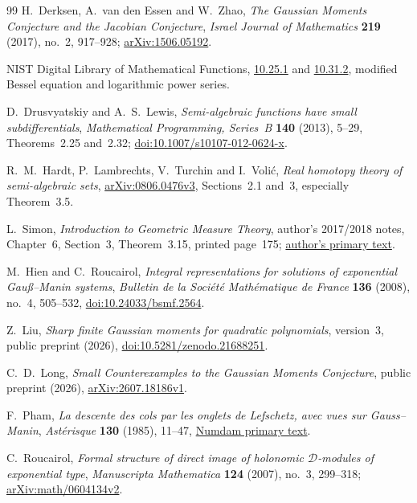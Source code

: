 \documentclass[11pt]{article}
\theoremstyle{definition}\newtheorem{definition}[theorem]{Definition}
\theoremstyle{remark}\newtheorem{remark}[theorem]{Remark}
\begin{document}
\clearpage
\begin{thebibliography}{99}
H.~Derksen, A.~van den Essen and W.~Zhao,
\emph{The Gaussian Moments Conjecture and the Jacobian Conjecture},
\emph{Israel Journal of Mathematics} \textbf{219} (2017), no.~2,
917--928; \href{https://arxiv.org/abs/1506.05192}{arXiv:1506.05192}.

NIST Digital Library of Mathematical Functions,
\href{https://dlmf.nist.gov/10.25.E1}{10.25.1} and
\href{https://dlmf.nist.gov/10.31.E2}{10.31.2},
modified Bessel equation and logarithmic power series.

D.~Drusvyatskiy and A.~S.~Lewis, \emph{Semi-algebraic functions have
small subdifferentials}, \emph{Mathematical Programming, Series~B}
\textbf{140} (2013), 5--29, Theorems~2.25 and~2.32;
\href{https://doi.org/10.1007/s10107-012-0624-x}{doi:10.1007/s10107-012-0624-x}.

R.~M.~Hardt, P.~Lambrechts, V.~Turchin and I.~Voli\'c,
\emph{Real homotopy theory of semi-algebraic sets},
\href{https://arxiv.org/abs/0806.0476v3}{arXiv:0806.0476v3},
Sections~2.1 and~3, especially Theorem~3.5.

L.~Simon, \emph{Introduction to Geometric Measure Theory},
author's 2017/2018 notes, Chapter~6, Section~3, Theorem~3.15,
printed page~175;
\href{https://math.stanford.edu/~lms/ntu-gmt-text.pdf}{author's primary text}.

M.~Hien and C.~Roucairol, \emph{Integral representations for solutions
of exponential Gau\ss--Manin systems},
\emph{Bulletin de la Soci\'et\'e Math\'ematique de France}
\textbf{136} (2008), no.~4, 505--532,
\href{https://doi.org/10.24033/bsmf.2564}{doi:10.24033/bsmf.2564}.

Z.~Liu, \emph{Sharp finite Gaussian moments for quadratic polynomials},
version~3, public preprint (2026),
\href{https://doi.org/10.5281/zenodo.21688251}{doi:10.5281/zenodo.21688251}.

C.~D.~Long, \emph{Small Counterexamples to the Gaussian Moments Conjecture},
public preprint (2026),
\href{https://arxiv.org/abs/2607.18186v1}{arXiv:2607.18186v1}.

F.~Pham, \emph{La descente des cols par les onglets de Lefschetz,
avec vues sur Gauss--Manin}, \emph{Ast\'erisque} \textbf{130}
(1985), 11--47,
\href{https://numdam.org/item/AST_1985__130__11_0/}{Numdam primary text}.

C.~Roucairol, \emph{Formal structure of direct image of holonomic
$\mathcal D$-modules of exponential type},
\emph{Manuscripta Mathematica} \textbf{124} (2007), no.~3, 299--318;
\href{https://arxiv.org/abs/math/0604134v2}{arXiv:math/0604134v2}.


\end{thebibliography}
\end{document}
